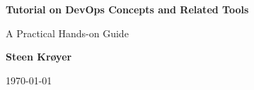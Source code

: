 \begin{titlepage}
    \begin{center}
        \vspace*{1cm}

        \Huge
        \textbf{Tutorial on DevOps Concepts and Related Tools}

        \vspace{0.5cm}
        \LARGE
        A Practical Hands-on Guide

        \vspace{1.5cm}

        \textbf{Steen Krøyer}

        \vspace{2cm}

        

        \vfill
        \Large
        \today

    \end{center}
\end{titlepage}